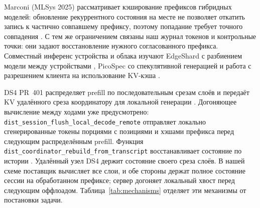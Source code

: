 Marconi (MLSys 2025) рассматривает кэширование префиксов гибридных моделей: обновление рекуррентного
состояния на месте не позволяет откатить запись к частично совпавшему префиксу, поэтому попадание
требует точного совпадения \cite{pan2025marconi}. С тем же ограничением связаны наш журнал токенов
и контрольные точки: они задают восстановление нужного согласованного префикса.
Совместный инференс устройства и облака изучают EdgeShard с разбиением модели между устройствами
\cite{zhang2024edgeshard}, PicoSpec со спекулятивной генерацией \cite{zhang2026picospec} и работа
с разрешением клиента на использование KV-кэша \cite{li2026authorizedkv}.

DS4 PR~401 распределяет prefill по последовательным срезам слоёв и передаёт KV удалённого среза координатору
для локальной генерации \cite{ds4pr401}. Догоняющее вычисление между ходами уже предусмотрено:
\texttt{dist\_session\_flush\_local\_decode\_remote} отправляет локально сгенерированные токены порциями с позициями
и хэшами префикса перед следующим распределённым prefill. Функция
\texttt{dist\_coordinator\_rebuild\_from\_transcript} восстанавливает состояние по истории \cite{ds4code401}.
Удалённый узел DS4 держит состояние своего среза слоёв. В нашей схеме поставщик вычисляет все слои,
и обе стороны держат полное состояние сессии на обработанном префиксе; сервер догоняет локальный хвост перед
следующим оффлоадом. Таблица~\ref{tab:mechanisms} отделяет эти механизмы от постановки задачи.

